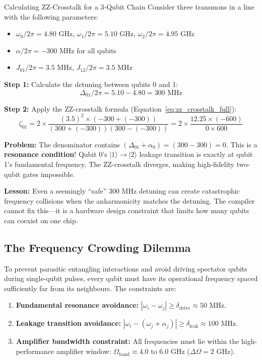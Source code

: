 \begin{examplebox}{Calculating ZZ-Crosstalk for a 3-Qubit Chain}
Consider three transmons in a line with the following parameters:
\begin{itemize}
    \item $\omega_0 / 2\pi = 4.80\text{ GHz}$, \quad $\omega_1 / 2\pi = 5.10\text{ GHz}$, \quad $\omega_2 / 2\pi = 4.95\text{ GHz}$
    \item $\alpha / 2\pi = -300\text{ MHz}$ for all qubits
    \item $J_{01} / 2\pi = 3.5\text{ MHz}$, \quad $J_{12} / 2\pi = 3.5\text{ MHz}$
\end{itemize}

\textbf{Step 1:} Calculate the detuning between qubits 0 and 1:
\[
\Delta_{01} / 2\pi = 5.10 - 4.80 = 300\text{ MHz}
\]

\textbf{Step 2:} Apply the ZZ-crosstalk formula (Equation~\ref{eq:zz_crosstalk_full}):
\[
\zeta_{01} = 2 \times \frac{(3.5)^2 \times (-300 + (-300))}{(300 + (-300))(300 - (-300))} = 2 \times \frac{12.25 \times (-600)}{0 \times 600}
\]

\textbf{Problem:} The denominator contains $(\Delta_{01} + \alpha_0) = (300 - 300) = 0$. This is a \textbf{resonance condition}! Qubit 0's $|1\rangle \to |2\rangle$ leakage transition is exactly at qubit 1's fundamental frequency. The ZZ-crosstalk diverges, making high-fidelity two-qubit gates impossible.

\textbf{Lesson:} Even a seemingly ``safe'' 300 MHz detuning can create catastrophic frequency collisions when the anharmonicity matches the detuning. The compiler cannot fix this---it is a hardware design constraint that limits how many qubits can coexist on one chip.
\end{examplebox}

\subsection{The Frequency Crowding Dilemma}

To prevent parasitic entangling interactions and avoid driving spectator qubits during single-qubit pulses, every qubit must have its operational frequency spaced sufficiently far from its neighbours. The constraints are:

\begin{enumerate}
    \item \textbf{Fundamental resonance avoidance:} $|\omega_i - \omega_j| \ge \delta_{\text{drive}} \approx 50\text{ MHz}$.
    \item \textbf{Leakage transition avoidance:} $|\omega_i - (\omega_j + \alpha_j)| \ge \delta_{\text{leak}} \approx 100\text{ MHz}$.
    \item \textbf{Amplifier bandwidth constraint:} All frequencies must lie within the high-performance amplifier window: $\Omega_{\text{band}} \approx 4.0$ to $6.0\text{ GHz}$ ($\Delta\Omega = 2\text{ GHz}$).
\end{enumerate}

